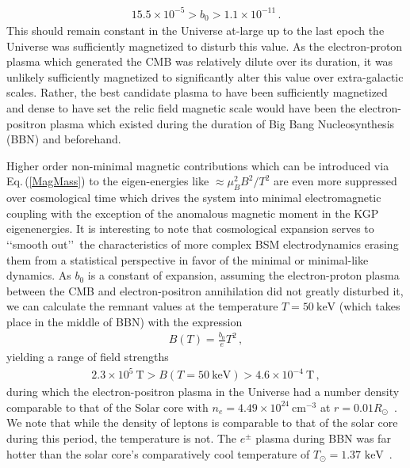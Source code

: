 \documentclass[universe,article,submit,moreauthors,pdftex,a4paper]{Definitions/mdpi}
\newcommand{\keV}{\text{ keV}}
\newcommand{\req}[1]{Eq.\,(\ref{#1})}
\begin{document}
\begin{alignat}{1}
 \label{BoScale} 5.5\times10^{-5}>b_{0}>1.1\times10^{-11}\,.
\end{alignat}
This should remain constant in the Universe at-large up to the last epoch the Universe was sufficiently magnetized to disturb this value. As the electron-proton plasma which generated the CMB was relatively dilute over its duration, it was unlikely sufficiently magnetized to significantly alter this value over extra-galactic scales. Rather, the best candidate plasma to have been sufficiently magnetized and dense to have set the relic field magnetic scale would have been the electron-positron plasma which existed during the duration of Big Bang Nucleosynthesis (BBN) and beforehand.

Higher order non-minimal magnetic contributions which can be introduced via \req{MagMass} to the eigen-energies like $\approx\mu_{B}^{2}B^{2}/T^{2}$ are even more suppressed over cosmological time which drives the system into minimal electromagnetic coupling with the exception of the anomalous magnetic moment in the KGP eigenenergies. It is interesting to note that cosmological expansion serves to \lq\lq smooth out\rq\rq\ the characteristics of more complex BSM electrodynamics erasing them from a statistical perspective in favor of the minimal or minimal-like dynamics. As $b_0$ is a constant of expansion, assuming the electron-proton plasma between the CMB and electron-positron annihilation did not greatly disturbed it, we can calculate the remnant values at the temperature $T=50\ \mathrm{keV}$ (which takes place in the middle of BBN) with the expression
\begin{align}
 \label{BBNFields} B(T)=\frac{b_{0}}{e}T^{2}\,,
\end{align}
yielding a range of field strengths
\begin{align}
 \label{BBNRange} 2.3\times10^{5}\ \mathrm{T}>B(T=50\ \mathrm{keV})>4.6\times10^{-4}\ \mathrm{T}\,,
\end{align}
during which the electron-positron plasma in the Universe had a number density comparable to that of the Solar core with $n_{e}=4.49\times10^{24}\ \mathrm{cm}^{-3}$ at $r=0.01R_{\odot}$~\cite{Bahcall:2000nu}. We note that while the density of leptons is comparable to that of the solar core during this period, the temperature is not. The $e^{\pm}$ plasma during BBN was far hotter than the solar core's comparatively cool temperature of $T_{\odot}=1.37\keV$~\cite{Castellani:1996cm}.

\end{document}
